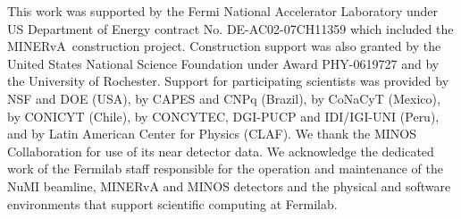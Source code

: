 \documentclass[%
preprint,
 amsmath,amssymb,
 aps,
]{revtex4-1}
\newcommand{\minerva}{\mbox{MINERvA}}
\begin{document}
\begin{acknowledgments}

This work was supported by the Fermi National Accelerator Laboratory
under US Department of Energy contract No. DE-AC02-07CH11359 which
included the \minerva\ construction project.  Construction support was
also granted by the United States National Science Foundation under
Award PHY-0619727 and by the University of Rochester. Support for
participating scientists was provided by NSF and DOE (USA), by CAPES
and CNPq (Brazil), by CoNaCyT (Mexico), by CONICYT (Chile), by
CONCYTEC, DGI-PUCP and IDI/IGI-UNI (Peru), and by Latin American
Center for Physics (CLAF).  We thank the
MINOS Collaboration for use of its near detector data. We acknowledge
the dedicated work of the Fermilab staff responsible for the operation and maintenance of the NuMI beamline, MINERvA and MINOS detectors and the physical and software environments that support scientific
computing at Fermilab.


\end{acknowledgments}
\end{document}
